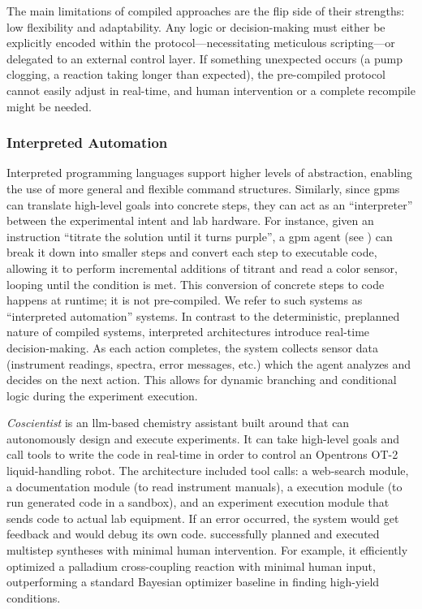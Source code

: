 The main limitations of compiled approaches are the flip side of their strengths: low flexibility and adaptability. 
Any logic or decision-making must either be explicitly encoded within the protocol---necessitating meticulous scripting---or delegated to an external control layer.\autocite{mehr2023digitizing,leonov2024integrated} 
If something unexpected occurs (a pump clogging, a reaction taking longer than expected), the pre-compiled protocol cannot easily adjust in real-time, and human intervention or a complete recompile might be needed.

\subsubsection{Interpreted Automation}
Interpreted programming languages support higher levels of abstraction, enabling the use of more general and flexible command structures. 
Similarly, since \glspl{gpm} can translate high-level goals into concrete steps\autocite{ahn2022can, huang2022language}, they can act as an \enquote{interpreter} between the experimental intent and lab hardware. 
For instance, given an instruction \enquote{titrate the solution until it turns purple}, a \gls{gpm} agent (see ) can break it down into smaller steps and convert each step to executable code, allowing it to perform incremental additions of titrant and read a color sensor, looping until the condition is met. 
This conversion of concrete steps to code happens at runtime; it is not pre-compiled. 
We refer to such systems as \enquote{interpreted automation} systems. 
In contrast to the deterministic, preplanned nature of compiled systems, interpreted architectures introduce real-time decision-making.
As each action completes, the system collects sensor data (instrument readings, spectra, error messages, etc.) which the agent analyzes and decides on the next action. This allows for dynamic branching and conditional logic during the experiment execution. 

\emph{Coscientist} \autocite{boiko2023autonomous} is an \gls{llm}-based chemistry assistant built around  that can autonomously design and execute experiments. 
It can take high-level goals and call tools to write the code in real-time in order to control an Opentrons OT-2 liquid-handling robot. The architecture included tool calls: a web-search module, a documentation module (to read instrument manuals), a  execution module (to run generated code in a sandbox), and an experiment execution module that sends code to actual lab equipment.
If an error occurred, the system would get feedback and  would debug its own code.  successfully planned and executed multistep syntheses with minimal human intervention. 
For example, it efficiently optimized a palladium cross-coupling reaction with minimal human input, outperforming a standard Bayesian optimizer baseline in finding high-yield conditions.

